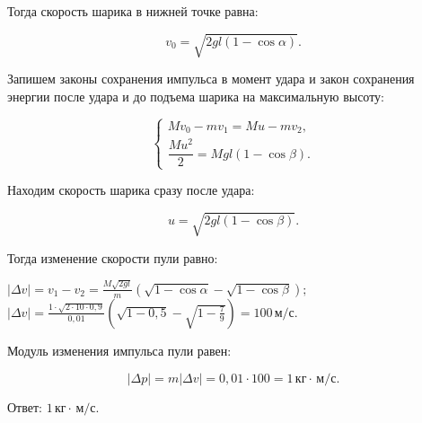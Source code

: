 \documentclass[12pt,a4paper]{article}
\begin{document}
{Тогда скорость шарика в нижней точке равна:

\[v _0= \sqrt{2gl ( 1 - \cos \alpha )} .\]

Запишем законы сохранения импульса в момент удара и закон сохранения энергии после удара и до подъема шарика на максимальную высоту:

\[\begin{cases}Mv_0-mv_1=Mu-mv_2,\\ \dfrac{Mu^2}{2}=Mgl(1-\cos\beta).\end{cases}\]

Находим скорость шарика сразу после удара:

\[u= \sqrt{2gl ( 1 - \cos \beta )} .\]

Тогда изменение скорости пули равно:

$|\Delta v | = v _1 - v _2= \frac{M \sqrt{2gl}}{m} ( \sqrt{1 - \cos \alpha} - \sqrt{1 - \cos \beta} ) ;$
$|\Delta v|=\frac{1\cdot\sqrt{2\cdot10\cdot0{,}9}}{0{,}01}\left(\sqrt{1-0{,}5}-\sqrt{1-\frac79}\right)=100\,\text{м/с}.$

Модуль изменения импульса пули равен:

\[|\Delta p|=m|\Delta v |=0{,}01 \cdot 100=1 \,\text{кг} \cdot \,\text{м/с} .\]

Ответ: $1 \,\text{кг} \cdot \,\text{м/с} .$
}
\end{document}
